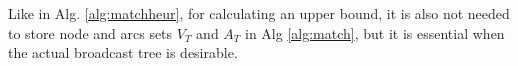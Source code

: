 Like in Alg. \ref{alg:matchheur}, for calculating an upper bound, it is also not needed to store node and arcs sets $V_T$ and $A_T$ in Alg \ref{alg:match},
but it is essential when the actual broadcast tree is desirable.
